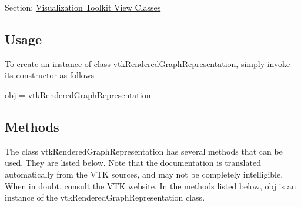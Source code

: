 Section\-: \hyperlink{sec_vtkviews}{Visualization Toolkit View Classes} \hypertarget{vtkwidgets_vtkxyplotwidget_Usage}{}\subsection{Usage}\label{vtkwidgets_vtkxyplotwidget_Usage}
To create an instance of class vtk\-Rendered\-Graph\-Representation, simply invoke its constructor as follows \begin{DoxyVerb}  obj = vtkRenderedGraphRepresentation
\end{DoxyVerb}
 \hypertarget{vtkwidgets_vtkxyplotwidget_Methods}{}\subsection{Methods}\label{vtkwidgets_vtkxyplotwidget_Methods}
The class vtk\-Rendered\-Graph\-Representation has several methods that can be used. They are listed below. Note that the documentation is translated automatically from the V\-T\-K sources, and may not be completely intelligible. When in doubt, consult the V\-T\-K website. In the methods listed below, {\ttfamily obj} is an instance of the vtk\-Rendered\-Graph\-Representation class. 
